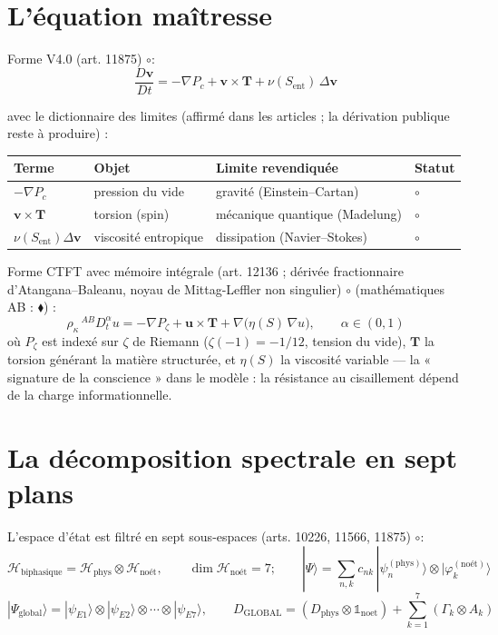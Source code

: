 \documentclass[11pt,a4paper]{article}
\newcommand{\SET}{\ensuremath{\blacklozenge}}
\newcommand{\SCONJ}{\ensuremath{\circ}}
\newcommand{\sent}{S_{\mathrm{ent}}}
\begin{document}
\section{L'équation maîtresse}
\label{sec:maitresse}

Forme V4.0 (art. 11875) \SCONJ :
\begin{equation}
\boxed{\ \frac{D\mathbf{v}}{Dt} = -\nabla P_c + \mathbf{v}\times\mathbf{T} + \nu(\sent)\,\Delta \mathbf{v}\ }
\label{eq:maitresse}
\end{equation}

avec le dictionnaire des limites (affirmé dans les articles ; la dérivation publique reste à produire) :
\begin{center}
\begin{tabular}{@{}llll@{}}
\toprule
Terme & Objet & Limite revendiquée & Statut \\
\midrule
$-\nabla P_c$ & pression du vide & gravité (Einstein--Cartan) & \SCONJ \\
$\mathbf{v}\times\mathbf{T}$ & torsion (spin) & mécanique quantique (Madelung) & \SCONJ \\
$\nu(\sent)\Delta\mathbf{v}$ & viscosité entropique & dissipation (Navier--Stokes) & \SCONJ \\
\bottomrule
\end{tabular}
\end{center}

Forme CTFT avec mémoire intégrale (art. 12136 ; dérivée fractionnaire d'Atangana--Baleanu, noyau de Mittag-Leffler non singulier) \SCONJ{} (mathématiques AB : \SET) :
\begin{equation}
\rho_\kappa\, {}^{AB}D_t^{\alpha} u = -\nabla P_\zeta + \mathbf{u}\times\mathbf{T} + \nabla\big(\eta(S)\,\nabla u\big),
\qquad \alpha\in(0,1)
\label{eq:ctft}
\end{equation}
où $P_\zeta$ est indexé sur $\zeta$ de Riemann ($\zeta(-1) = -1/12$, tension du vide), $\mathbf{T}$ la torsion générant la matière structurée, et $\eta(S)$ la viscosité variable --- la « signature de la conscience » dans le modèle : la résistance au cisaillement dépend de la charge informationnelle.

\section{La décomposition spectrale en sept plans}
\label{sec:plans}

L'espace d'état est filtré en sept sous-espaces (arts. 10226, 11566, 11875) \SCONJ :
\begin{equation}
\mathcal{H}_{\mathrm{biphasique}} = \mathcal{H}_{\mathrm{phys}}\otimes\mathcal{H}_{\mathrm{noét}},
\qquad \dim\mathcal{H}_{\mathrm{noét}} = 7 ;
\qquad
|\Psi\rangle = \sum_{n,k} c_{nk}\,|\psi_n^{(\mathrm{phys})}\rangle\otimes|\varphi_k^{(\mathrm{noét})}\rangle
\end{equation}
\begin{equation}
|\Psi_{\mathrm{global}}\rangle = |\psi_{E1}\rangle\otimes|\psi_{E2}\rangle\otimes\cdots\otimes|\psi_{E7}\rangle,
\qquad
D_{\mathrm{GLOBAL}} = (D_{\mathrm{phys}}\otimes\mathbb{1}_{\mathrm{noet}}) + \sum_{k=1}^{7}(\Gamma_k\otimes A_k)
\end{equation}
\end{document}
